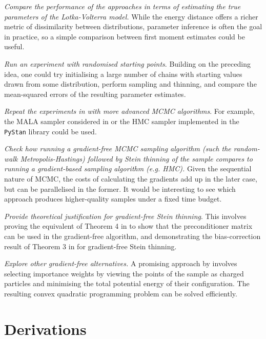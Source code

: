 \documentclass[11pt,a4paper]{report}
\begin{document}
\textit{Compare the performance of the approaches in terms of estimating the true parameters of the Lotka-Volterra model.} While the energy distance offers a richer metric of dissimilarity between distributions, parameter inference is often the goal in practice, so a simple comparison between first moment estimates could be useful.

\textit{Run an experiment with randomised starting points}. Building on the preceding idea, one could try initialising a large number of chains with starting values drawn from some distribution, perform sampling and thinning, and compare the mean-squared errors of the resulting parameter estimates.

\textit{Repeat the experiments in  with more advanced MCMC algorithms}. For example, the MALA sampler considered in \cite{riabizOptimalThinningMCMC2022} or the HMC sampler implemented in the \texttt{PyStan} library could be used.

\textit{Check how running a gradient-free MCMC sampling algorithm (such the random-walk Metropolis-Hastings) followed by Stein thinning of the sample compares to running a gradient-based sampling algorithm (e.g. HMC).} Given the sequential nature of MCMC, the costs of calculating the gradients add up in the later case, but can be parallelised in the former. It would be interesting to see which approach produces higher-quality samples under a fixed time budget.

\textit{Provide theoretical justification for gradient-free Stein thinning}. This involves proving the equivalent of Theorem 4 in \cite{chenSteinPointMarkov2019} to show that the preconditioner matrix can be used in the gradient-free algorithm, and demonstrating the bias-correction result of Theorem 3 in \cite{riabizOptimalThinningMCMC2022} for gradient-free Stein thinning.

\textit{Explore other gradient-free alternatives.} A promising approach by \cite{huangEnhancingSampleQuality2023} involves selecting importance weights by viewing the points of the sample as charged particles and minimising the total potential energy of their configuration. The resulting convex quadratic programming problem can be solved efficiently.





\appendix

\chapter{Derivations}
\label{appendix:derivations}
\end{document}
